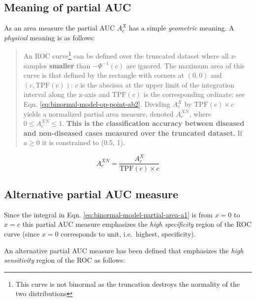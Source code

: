 \documentclass[
]{book}
\begin{document}
\hypertarget{binormal-model-meaning-partial-auc}{%
\subsection{Meaning of partial AUC}\label{binormal-model-meaning-partial-auc}}

As an area measure the partial AUC \(A_c^{X}\) has a simple \emph{geometric} meaning. A \emph{physical} meaning is as follows:

\begin{quote}
An ROC curve\footnote{This curve is not binormal as the truncation destroys the normality of the two distributions} can be defined over the truncated dataset where all z-samples \textbf{smaller} than \(-\Phi^{-1}(c)\) are ignored. The maximum area of this curve is that defined by the rectangle with corners at \((0,0)\) and \((c,\text{TPF}\left ( c \right ))\): \(c\) is the abscissa at the upper limit of the integration interval along the x-axis and \(\text{TPF}\left ( c \right )\) is the corresponding ordinate: see Eqn. \eqref{eq:binormal-model-op-point-ab2}. Dividing \(A_c^{X}\) by \(\text{TPF}\left ( c \right ) \times c\) yields a normalized partial area measure, denoted \(A_c^{XN}\), where \(0 \le A_c^{XN} \le 1\). \textbf{This is the classification accuracy between diseased and non-diseased cases measured over the truncated dataset.} If \(a \ge 0\) it is constrained to (0.5, 1).
\end{quote}

\begin{equation}
A_c^{XN} = \frac{A_c^{X}}{\text{TPF}\left ( c \right ) \times c}
\label{eq:binormal-model-normalized-partial-auc}
\end{equation}

\hypertarget{binormal-model-metz-partial-auc}{%
\subsection{Alternative partial AUC measure}\label{binormal-model-metz-partial-auc}}

Since the integral in Eqn. \eqref{eq:binormal-model-partial-area-a1} is from \(x = 0\) to \(x = c\) this partial AUC measure emphasizes the \emph{high specificity} region of the ROC curve (since \(x = 0\) corresponds to unit, i.e.~highest, specificity).

An alternative partial AUC measure has been defined \citep{jiang1996receiver} that emphasizes the \emph{high sensitivity} region of the ROC as follows:
\end{document}
